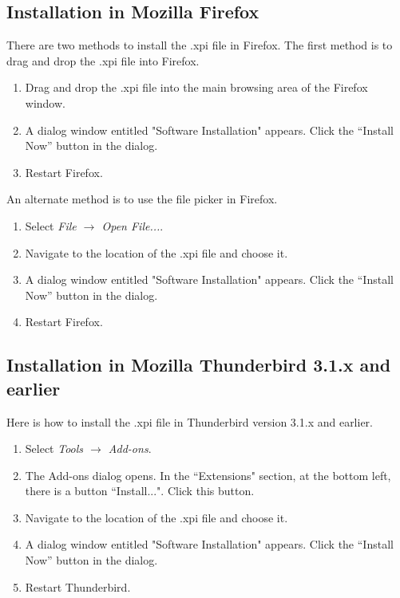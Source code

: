 \subsection{Installation in Mozilla Firefox}
There are two methods to install the .xpi file in Firefox. The first method is to drag and drop the .xpi file into Firefox.
\begin{enumerate}
  \item Drag and drop the .xpi file into the main browsing area of the Firefox window.
  \item A dialog window entitled "Software Installation" appears. Click the ``Install Now'' button in the dialog.
  \item Restart Firefox.
\end{enumerate}
An alternate method is to use the file picker in Firefox.
\begin{enumerate}
  \item Select \emph{File $\rightarrow$ Open File...}.
  \item Navigate to the location of the .xpi file and choose it.
  \item A dialog window entitled "Software Installation" appears. Click the ``Install Now'' button in the dialog.
  \item Restart Firefox.
\end{enumerate}

\subsection{Installation in Mozilla Thunderbird 3.1.x and earlier}
Here is how to install the .xpi file in Thunderbird version 3.1.x and earlier. 
\begin{enumerate}
  \item Select \emph{Tools $\rightarrow$ Add-ons}.
  \item The Add-ons dialog opens. In the ``Extensions" section, at the bottom left, there is a button ``Install...". Click this button.
  \item Navigate to the location of the .xpi file and choose it.
  \item A dialog window entitled "Software Installation" appears. Click the ``Install Now'' button in the dialog.
  \item Restart Thunderbird.
\end{enumerate}

